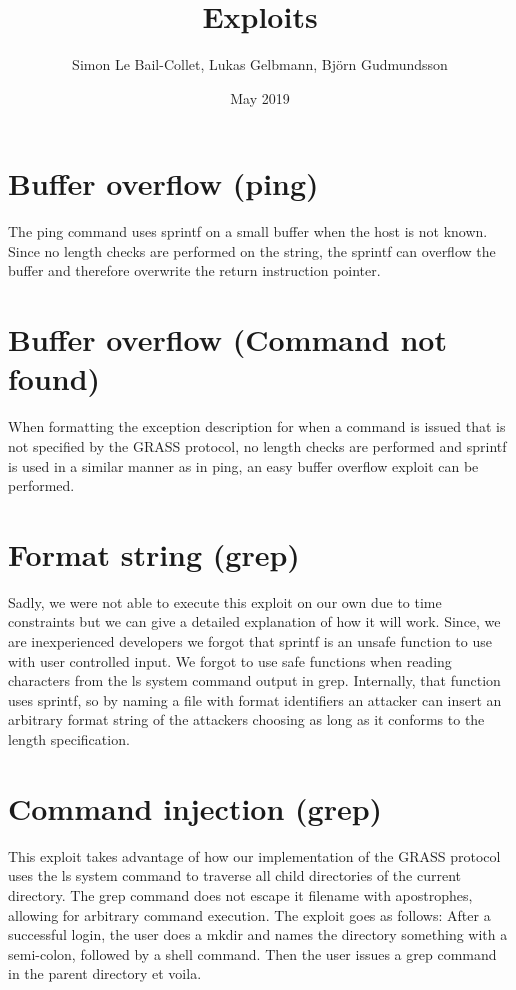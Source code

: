 \documentclass{article}
\title{Exploits}
\author{Simon Le Bail-Collet, Lukas Gelbmann, Björn Gudmundsson}
\date{May 2019}
\begin{document}
\maketitle

\section{Buffer overflow (ping)}
The ping command uses sprintf on a small buffer when the host is not known. Since no length checks are performed on the string, the sprintf can overflow 
the buffer and therefore overwrite the return instruction pointer.

\section{Buffer overflow (Command not found)}
When formatting the exception description for when a command is issued that is not specified by the GRASS protocol, no length checks are performed and sprintf
is used in a similar manner as in ping, an easy buffer overflow exploit can be performed. 


\section{Format string (grep)}

Sadly, we were not able to execute this exploit on our own due to time constraints but we can give a detailed explanation of how it will work. 
Since, we are inexperienced developers we forgot that sprintf is an unsafe function to use with user controlled input. We forgot to use safe functions when reading characters
from the ls system command output in grep. Internally, that function uses sprintf, so by naming a file with format identifiers an attacker can insert an arbitrary 
format string of the attackers choosing as long as it conforms to the length specification.

\section{Command injection (grep)}
This exploit takes advantage of how our implementation of the GRASS protocol uses the ls system command to traverse all child directories of the current directory.
The grep command does not escape it filename with apostrophes, allowing for arbitrary command execution. The exploit goes as follows: After a successful login, the user does a mkdir 
and names the directory something with a semi-colon, followed by a shell command. Then the user issues a grep command in the parent directory et voila.
\end{document}
